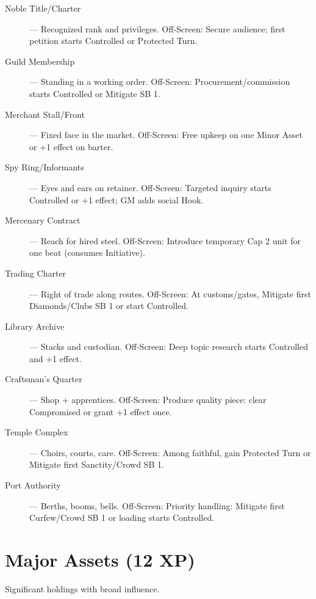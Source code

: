 \begin{description}
  \item[Noble Title/Charter] — Recognized rank and privileges. Off-Screen: Secure audience; first petition starts Controlled or Protected Turn.
  \item[Guild Membership] — Standing in a working order. Off-Screen: Procurement/commission starts Controlled or Mitigate SB 1.
  \item[Merchant Stall/Front] — Fixed face in the market. Off-Screen: Free upkeep on one Minor Asset or +1 effect on barter.
  \item[Spy Ring/Informants] — Eyes and ears on retainer. Off-Screen: Targeted inquiry starts Controlled or +1 effect; GM adds social Hook.
  \item[Mercenary Contract] — Reach for hired steel. Off-Screen: Introduce temporary Cap 2 unit for one beat (consumes Initiative).
  \item[Trading Charter] — Right of trade along routes. Off-Screen: At customs/gates, Mitigate first Diamonds/Clubs SB 1 or start Controlled.
  \item[Library Archive] — Stacks and custodian. Off-Screen: Deep topic research starts Controlled and +1 effect.
  \item[Craftsman's Quarter] — Shop + apprentices. Off-Screen: Produce quality piece: clear Compromised or grant +1 effect once.
  \item[Temple Complex] — Choirs, courts, care. Off-Screen: Among faithful, gain Protected Turn or Mitigate first Sanctity/Crowd SB 1.
  \item[Port Authority] — Berths, booms, bells. Off-Screen: Priority handling: Mitigate first Curfew/Crowd SB 1 or loading starts Controlled.
\end{description}

\section{Major Assets (12 XP)}

Significant holdings with broad influence.

